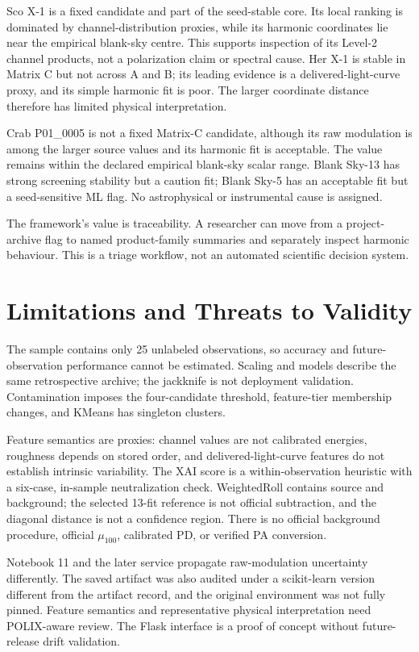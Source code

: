 \documentclass[conference]{IEEEtran}
\begin{document}
Sco X-1 is a fixed candidate and part of the seed-stable core. Its local ranking is dominated by channel-distribution proxies, while its harmonic coordinates lie near the empirical blank-sky centre. This supports inspection of its Level-2 channel products, not a polarization claim or spectral cause. Her X-1 is stable in Matrix C but not across A and B; its leading evidence is a delivered-light-curve proxy, and its simple harmonic fit is poor. The larger coordinate distance therefore has limited physical interpretation.

Crab P01\_0005 is not a fixed Matrix-C candidate, although its raw modulation is among the larger source values and its harmonic fit is acceptable. The value remains within the declared empirical blank-sky scalar range. Blank Sky-13 has strong screening stability but a caution fit; Blank Sky-5 has an acceptable fit but a seed-sensitive ML flag. No astrophysical or instrumental cause is assigned.

The framework's value is traceability. A researcher can move from a project-archive flag to named product-family summaries and separately inspect harmonic behaviour. This is a triage workflow, not an automated scientific decision system.

\section{Limitations and Threats to Validity}
The sample contains only 25 unlabeled observations, so accuracy and future-observation performance cannot be estimated. Scaling and models describe the same retrospective archive; the jackknife is not deployment validation. Contamination imposes the four-candidate threshold, feature-tier membership changes, and KMeans has singleton clusters.

Feature semantics are proxies: channel values are not calibrated energies, roughness depends on stored order, and delivered-light-curve features do not establish intrinsic variability. The XAI score is a within-observation heuristic with a six-case, in-sample neutralization check. WeightedRoll contains source and background; the selected 13-fit reference is not official subtraction, and the diagonal distance is not a confidence region. There is no official background procedure, official $\mu_{100}$, calibrated PD, or verified PA conversion.

Notebook 11 and the later service propagate raw-modulation uncertainty differently. The saved artifact was also audited under a scikit-learn version different from the artifact record, and the original environment was not fully pinned. Feature semantics and representative physical interpretation need POLIX-aware review. The Flask interface is a proof of concept without future-release drift validation.
\end{document}
